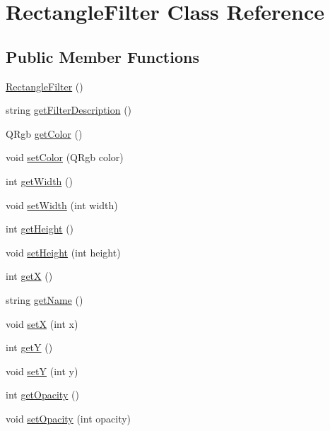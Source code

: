 \hypertarget{classModel_1_1Filter_1_1RectangleFilter}{}\section{Rectangle\+Filter Class Reference}
\label{classModel_1_1Filter_1_1RectangleFilter}
\subsection*{Public Member Functions}
\begin{DoxyCompactItemize}
\item 
\hyperlink{classModel_1_1Filter_1_1RectangleFilter_a74b7006780424b64c299443d1b54fc03}{Rectangle\+Filter} ()
\item 
string \hyperlink{classModel_1_1Filter_1_1RectangleFilter_a62b7b60e24f92234393b840b35808e06}{get\+Filter\+Description} ()
\item 
Q\+Rgb \hyperlink{classModel_1_1Filter_1_1RectangleFilter_ae697defefbdf5f895406269b15758d91}{get\+Color} ()
\item 
void \hyperlink{classModel_1_1Filter_1_1RectangleFilter_ad858846447f303e473dc8004ef607666}{set\+Color} (Q\+Rgb color)
\item 
int \hyperlink{classModel_1_1Filter_1_1RectangleFilter_a67a0997183f24da19b776d96c1052998}{get\+Width} ()
\item 
void \hyperlink{classModel_1_1Filter_1_1RectangleFilter_a8b4c8bccc530aa0a9b0139e04913af32}{set\+Width} (int width)
\item 
int \hyperlink{classModel_1_1Filter_1_1RectangleFilter_a07efb2a4e9a982688c8bb3c3f21d1092}{get\+Height} ()
\item 
void \hyperlink{classModel_1_1Filter_1_1RectangleFilter_a7013185ad2825ade83994b396c4fdfcd}{set\+Height} (int height)
\item 
int \hyperlink{classModel_1_1Filter_1_1RectangleFilter_ae13f88e922e1339355456062ad9fa359}{get\+X} ()
\item 
string \hyperlink{classModel_1_1Filter_1_1RectangleFilter_a11335e13e50af74108bf926dc1340b4b}{get\+Name} ()
\item 
void \hyperlink{classModel_1_1Filter_1_1RectangleFilter_add2578ea6b65ad27a905a6d2048748bb}{set\+X} (int x)
\item 
int \hyperlink{classModel_1_1Filter_1_1RectangleFilter_aab81944f0a14bba932c0931899951937}{get\+Y} ()
\item 
void \hyperlink{classModel_1_1Filter_1_1RectangleFilter_adea78a9ff1234e75627dda61d972213b}{set\+Y} (int y)
\item 
int \hyperlink{classModel_1_1Filter_1_1RectangleFilter_a0c8618c617e65d5ab8400704bbc09ed1}{get\+Opacity} ()
\item 
void \hyperlink{classModel_1_1Filter_1_1RectangleFilter_a22b140225648b55b27f2330938ae4006}{set\+Opacity} (int opacity)
\end{DoxyCompactItemize}

